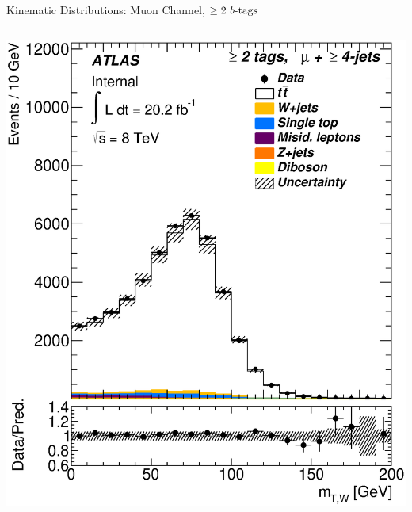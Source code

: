 \documentclass{beamer}
\begin{document}
{\begin{frame}{Kinematic Distributions: Muon Channel, $\geq2\text{ } \lowercase{ b\text{-tags}}$}
\begin{columns}
      \includegraphics[width=.95\textwidth]{../chapters/whel/figures/control_Plots2/bTag_2incl/TransverseMass_mu}
    \end{columns}
  \end{frame}

}
\end{document}
